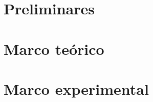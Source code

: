 
\iftrue
\part{Preliminares}



\part{Marco teórico}



\begingroup
  \let\clearpage\relax
  
  
\endgroup




\part{Marco experimental}


\fi
\setcounter{chapter}{5}


%


%







